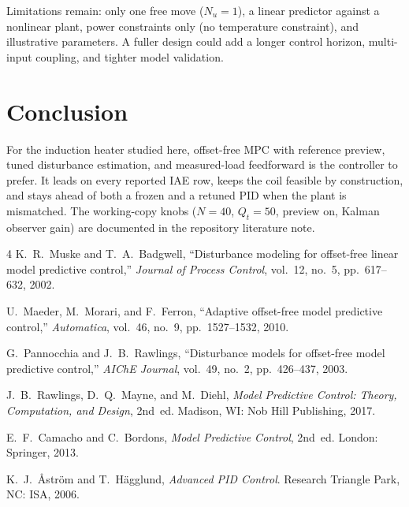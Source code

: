 \documentclass[11pt,a4paper]{article}
\begin{document}
Limitations remain: only one free move (\(N_u{=}1\)), a linear predictor against a nonlinear plant, power constraints only (no temperature constraint), and illustrative parameters.
A fuller design could add a longer control horizon, multi-input coupling, and tighter model validation.

\section{Conclusion}
For the induction heater studied here, offset-free MPC with reference preview, tuned disturbance estimation, and measured-load feedforward is the controller to prefer.
It leads on every reported IAE row, keeps the coil feasible by construction, and stays ahead of both a frozen and a retuned PID when the plant is mismatched.
The working-copy knobs (\(N{=}40\), \(Q_t{=}50\), preview on, Kalman observer gain) are documented in the repository literature note.

\begin{thebibliography}{4}
\footnotesize
{}
K.~R.~Muske and T.~A.~Badgwell,
``Disturbance modeling for offset-free linear model predictive control,''
\emph{Journal of Process Control}, vol.~12, no.~5, pp.~617--632, 2002.

U.~Maeder, M.~Morari, and F.~Ferron,
``Adaptive offset-free model predictive control,''
\emph{Automatica}, vol.~46, no.~9, pp.~1527--1532, 2010.

G.~Pannocchia and J.~B.~Rawlings,
``Disturbance models for offset-free model predictive control,''
\emph{AIChE Journal}, vol.~49, no.~2, pp.~426--437, 2003.

J.~B.~Rawlings, D.~Q.~Mayne, and M.~Diehl,
\emph{Model Predictive Control: Theory, Computation, and Design}, 2nd~ed.
Madison, WI: Nob Hill Publishing, 2017.

E.~F.~Camacho and C.~Bordons,
\emph{Model Predictive Control}, 2nd~ed.
London: Springer, 2013.

K.~J.~\r{A}str\"om and T.~H\"agglund,
\emph{Advanced PID Control}.
Research Triangle Park, NC: ISA, 2006.
\end{thebibliography}
\end{document}

